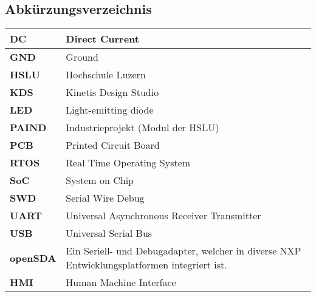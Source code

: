 \newpage
\begin{sffamily}
\section*{Abkürzungsverzeichnis}\label{dok:glossar}
\begin{table}[H]
	\begin{tabular}{|L{2.5cm}|L{13cm}|}
		\hline	
		\textbf{DC} & Direct Current\\
		
		\hline
		\textbf{GND} & Ground\\
		
		\hline
		\textbf{HSLU} & Hochschule Luzern \\ 
		
		\hline
		\textbf{KDS} & Kinetis Design Studio\\

		\hline
		\textbf{LED} & Light-emitting diode\\
		
	 	\hline
	 	\textbf{PAIND} &  Industrieprojekt (Modul der HSLU) \\ 
	 	
	 	\hline
	 	\textbf{PCB} &	Printed Circuit Board\\
				
		\hline
		\textbf{RTOS} & Real Time Operating System \\
		
		\hline
		\textbf{SoC} &	System on Chip\\
		
		\hline
		\textbf{SWD} &	Serial Wire Debug\\
		
		\hline
		\textbf{UART} &	Universal Asynchronous Receiver Transmitter\\
		
		\hline
		\textbf{USB} &	Universal Serial Bus\\		
		
		\hline
		\textbf{openSDA} & Ein Seriell- und Debugadapter, welcher in diverse NXP Entwicklungsplatformen integriert ist.\\
		
		\hline
		\textbf{HMI} & Human Machine Interface\\
				
		\hline
	\end{tabular} 
	\vspace{0.2cm}
\end{table}



\end{sffamily}
